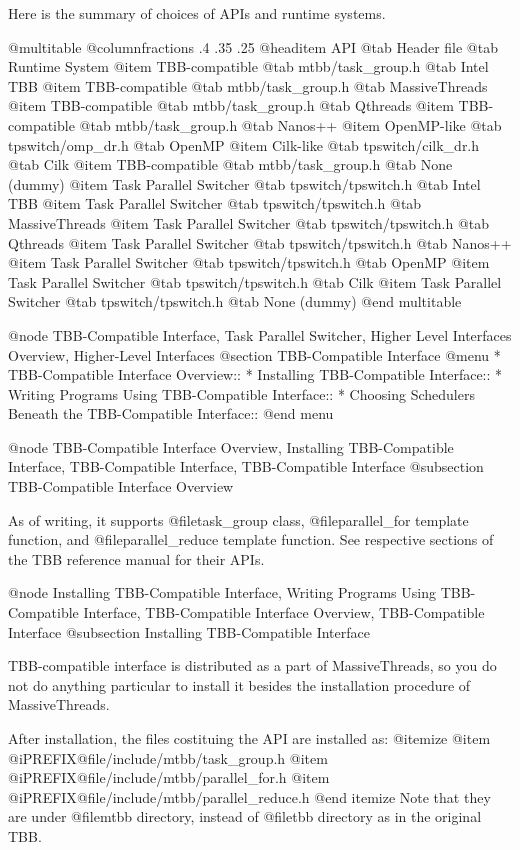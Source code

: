 Here is the summary of choices of APIs and runtime systems.

@multitable @columnfractions .4 .35 .25
@headitem API            @tab Header file       @tab Runtime System 
@item     TBB-compatible @tab mtbb/task_group.h @tab Intel TBB 
@item     TBB-compatible @tab mtbb/task_group.h @tab MassiveThreads
@item     TBB-compatible @tab mtbb/task_group.h @tab Qthreads
@item     TBB-compatible @tab mtbb/task_group.h @tab Nanos++
@item     OpenMP-like    @tab tpswitch/omp_dr.h          @tab OpenMP
@item     Cilk-like      @tab tpswitch/cilk_dr.h         @tab Cilk
@item     TBB-compatible @tab mtbb/task_group.h @tab None (dummy)
@item     Task Parallel Switcher @tab tpswitch/tpswitch.h @tab Intel TBB 
@item     Task Parallel Switcher @tab tpswitch/tpswitch.h @tab MassiveThreads
@item     Task Parallel Switcher @tab tpswitch/tpswitch.h @tab Qthreads
@item     Task Parallel Switcher @tab tpswitch/tpswitch.h @tab Nanos++
@item     Task Parallel Switcher @tab tpswitch/tpswitch.h @tab OpenMP
@item     Task Parallel Switcher @tab tpswitch/tpswitch.h @tab Cilk
@item     Task Parallel Switcher @tab tpswitch/tpswitch.h @tab None (dummy)
@end multitable

@node TBB-Compatible Interface, Task Parallel Switcher, Higher Level Interfaces Overview, Higher-Level Interfaces
@section TBB-Compatible Interface
@menu
* TBB-Compatible Interface Overview::
* Installing TBB-Compatible Interface::
* Writing Programs Using TBB-Compatible Interface::
* Choosing Schedulers Beneath the TBB-Compatible Interface::
@end menu

@node TBB-Compatible Interface Overview, Installing TBB-Compatible Interface, TBB-Compatible Interface, TBB-Compatible Interface
@subsection TBB-Compatible Interface Overview

As of writing, it supports @file{task_group} class, @file{parallel_for}
template function, and @file{parallel_reduce} template function.  See
respective sections of the TBB reference manual for their APIs.

@node Installing TBB-Compatible Interface, Writing Programs Using TBB-Compatible Interface, TBB-Compatible Interface Overview, TBB-Compatible Interface
@subsection Installing TBB-Compatible Interface

TBB-compatible interface is distributed as a part of MassiveThreads, so
you do not do anything particular to install it besides the installation
procedure of MassiveThreads.

After installation, the files costituing the API are installed as:
@itemize
@item @i{PREFIX}@file{/include/mtbb/task_group.h}
@item @i{PREFIX}@file{/include/mtbb/parallel_for.h}
@item @i{PREFIX}@file{/include/mtbb/parallel_reduce.h}
@end itemize
Note that they are under @file{mtbb} directory, instead of @file{tbb}
directory as in the original TBB.

